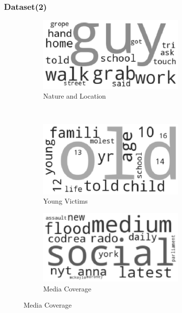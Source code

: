 \documentclass{beamer}
\begin{document}
	\begin{frame}
	\frametitle{Dataset(2)}
		\begin{figure}[h]
			\centering
			\begin{subfigure}{0.45\textwidth}
				\includegraphics[width=0.8\textwidth]{SS64.eps}
				\centering
				\caption{Nature and Location}
			\end{subfigure}\pause
			~
			\begin{subfigure}{0.45\textwidth}
				\includegraphics[width=0.8\textwidth]{SS65.eps}
				\centering
				\caption{Young Victims}
			\end{subfigure}\pause
		
			\begin{subfigure}{0.45\textwidth}
				\includegraphics[width=0.8\textwidth]{SS66.eps}
				\centering
				\caption{Media Coverage}
			\end{subfigure}
		\end{figure}
	\end{frame}
\end{document}
